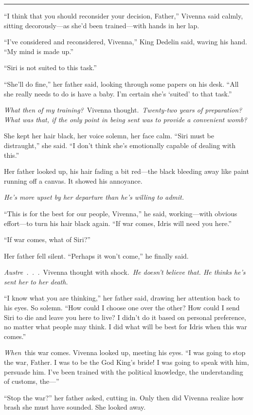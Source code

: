 \bigskip \hrule \bigskip

“I think that you should reconsider your decision, Father,” Vivenna said calmly, sitting decorously—as she’d been trained—with hands in her lap.

“I’ve considered and reconsidered, Vivenna,” King Dedelin said, waving his hand. “My mind is made up.”

“Siri is not suited to this task.”

“She’ll do fine,” her father said, looking through some papers on his desk. “All she really needs to do is have a baby. I’m certain she’s ‘suited’ to that task.”

\textit{What then of my training?}~Vivenna thought.~\textit{Twenty-two years of preparation? What was that, if the only point in being sent was to provide a convenient womb?}

She kept her hair black, her voice solemn, her face calm. “Siri must be distraught,” she said. “I don’t think she’s emotionally capable of dealing with this.”

Her father looked up, his hair fading a bit red—the black bleeding away like paint running off a canvas. It showed his annoyance.

\textit{He’s more upset by her departure than he’s willing to admit.}

“This is for the best for our people, Vivenna,” he said, working—with obvious effort—to turn his hair black again. “If war comes, Idris will need you here.”

“If war comes, what of Siri?”

Her father fell silent. “Perhaps it won’t come,” he finally said.

\textit{Austre~.~.~.}~Vivenna thought with shock.~\textit{He doesn’t believe that. He thinks he’s sent her to her death.}

“I know what you are thinking,” her father said, drawing her attention back to his eyes. So solemn. “How could I choose one over the other? How could I send Siri to die and leave you here to live? I didn’t do it based on personal preference, no matter what people may think. I did what will be best for Idris when this war comes.”

\textit{When}~this war comes. Vivenna looked up, meeting his eyes. “I was going to stop the war, Father. I was to be the God King’s bride! I was going to speak with him, persuade him. I’ve been trained with the political knowledge, the understanding of customs, the—”

“Stop the war?” her father asked, cutting in. Only then did Vivenna realize how brash she must have sounded. She looked away.


